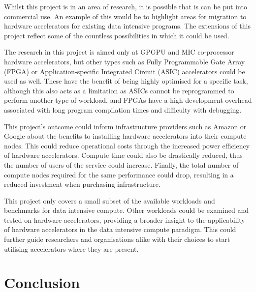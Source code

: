 \documentclass[12pt,a4paper]{article}
\begin{document}
            Whilst this project is in an area of research, it is possible that is can be put into commercial use. An example of this would be to highlight areas for migration to hardware accelerators for existing data intensive programs. The extensions of this project reflect some of the countless possibilities in which it could be used.

            \begin{description}[style=nextline]
                \item[\textbf{Additional Accelerator Types}] The research in this project is aimed only at GPGPU and MIC co-processor hardware accelerators, but other types such as Fully Programmable Gate Array (FPGA) or Application-specific Integrated Circuit (ASIC) accelerators could be used as well. These have the benefit of being highly optimised for a specific task, although this also acts as a limitation as ASICs cannot be reprogrammed to perform another type of workload, and FPGAs have a high development overhead associated with long program compilation times and difficulty with debugging.
                \item[\textbf{Infrastructure Design}] This project's outcome could inform infrastructure providers such as Amazon or Google about the benefits to installing hardware accelerators into their compute nodes. This could reduce operational costs through the increased power efficiency of hardware accelerators. Compute time could also be drastically reduced, thus the number of users of the service could increase. Finally, the total number of compute nodes required for the same performance could drop, resulting in a reduced investment when purchasing infrastructure.
                \item[\textbf{Additional Workload Testing}] This project only covers a small subset of the available workloads and benchmarks for data intensive compute. Other workloads could be examined and tested on hardware accelerators, providing a broader insight to the applicability of hardware accelerators in the data intensive compute paradigm. This could further guide researchers and organisations alike with their choices to start utilising accelerators where they are present.
            \end{description}
        
    \section{Conclusion}
    \label{sec:conclusion}
\end{document}
